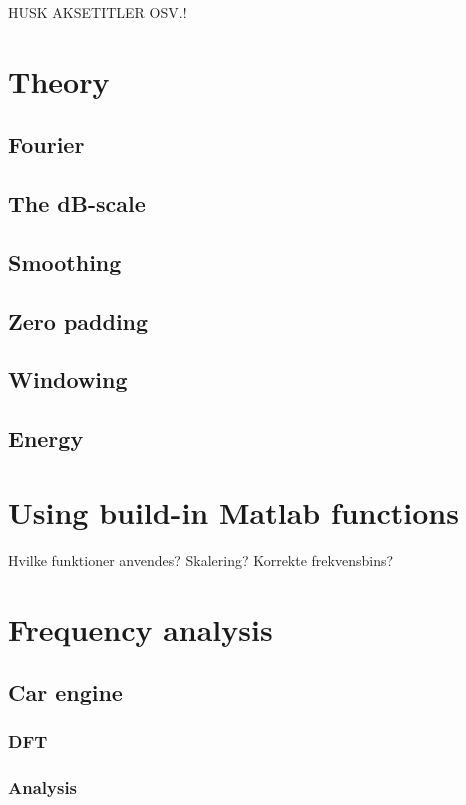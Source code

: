 HUSK AKSETITLER OSV.!

\section{Theory}
\subsection{Fourier}

\subsection{The dB-scale}

\subsection{Smoothing}

\subsection{Zero padding}

\subsection{Windowing}

\subsection{Energy}

\section{Using build-in Matlab functions}
Hvilke funktioner anvendes?
Skalering?
Korrekte frekvensbins?

\section{Frequency analysis}
\subsection{Car engine}
\subsubsection{DFT}

\subsubsection{Analysis}

